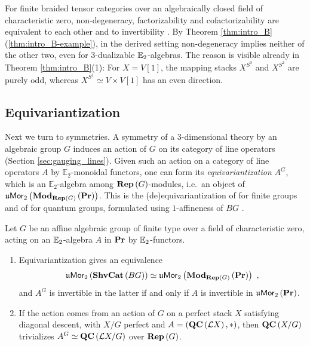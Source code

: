 For finite braided tensor categories over an algebraically closed field of characteristic zero,
non-degeneracy, factorizability and cofactorizability are equivalent to each other and to invertibility \cite{BJSS}. By Theorem \ref{thm:intro_B}(\ref{thm:intro_B-example}), in the
derived setting non-degeneracy implies neither of the other two, even for $3$-dualizable
$\mathbb{E}_2$-algebras. The reason is visible already in Theorem \ref{thm:intro_B}(1): For $X=V\left[1\right]$,
the mapping stacks $X^{S^0}$ and $X^{S^2}$ are purely odd, whereas
$X^{S^1}\simeq V\times V\left[1\right]$ has an even direction.

\subsection*{Equivariantization}
Next we turn to symmetries. A symmetry of a $3$-dimensional theory by an algebraic group $G$
induces an action of $G$ on its category of line operators (Section \ref{sec:gauging_lines}).
Given such an action on a category of line operators $A$ by
$\mathbb{E}_2$-monoidal functors, one can form its \emph{equivariantization} $A^G$, which
is an $\mathbb{E}_2$-algebra among $\mathbf{Rep}\left(G\right)$-modules, i.e.\ an object of
$\mathfrak{u}\mathsf{Mor}_2\left(\mathbf{Mod}_{\mathbf{Rep}\left(G\right)}\left(\mathbf{Pr}\right)\right)$.
This is the (de)equivariantization of \cite{DGNO} for finite groups and of \cite{AG:small}
for quantum groups, formulated using $1$-affineness of $BG$ \cite{G:ShvCat}.

\begin{introthm}
\label{thm:intro_equiv}
Let $G$ be an affine algebraic group of finite type over a field of characteristic zero, acting on
an $\mathbb{E}_2$-algebra $A$ in $\mathbf{Pr}$ by $\mathbb{E}_2$-functors.
\begin{enumerate}
\item Equivariantization gives an equivalence
\begin{equation*}
\mathfrak{u}\mathsf{Mor}_2\left(\mathbf{ShvCat}\left(BG\right)\right)\simeq\mathfrak{u}\mathsf{Mor}_2\left(\mathbf{Mod}_{\mathbf{Rep}\left(G\right)}\left(\mathbf{Pr}\right)\right)
\ ,
\end{equation*}
and $A^G$ is invertible in the latter if and only if $A$ is invertible in $\mathfrak{u}\mathsf{Mor}_2\left(\mathbf{Pr}\right)$.
\item If the action comes from an action of $G$ on a perfect stack $X$ satisfying diagonal
descent, with $X/G$ perfect and
$A=\left(\mathbf{QC}\left(\mathcal{L} X\right),*\right)$, then $\mathbf{QC}\left(X/G\right)$ trivializes
$A^G\simeq\mathbf{QC}\left(\mathcal{L} X/G\right)$ over $\mathbf{Rep}\left(G\right)$.
\end{enumerate}
\end{introthm}

